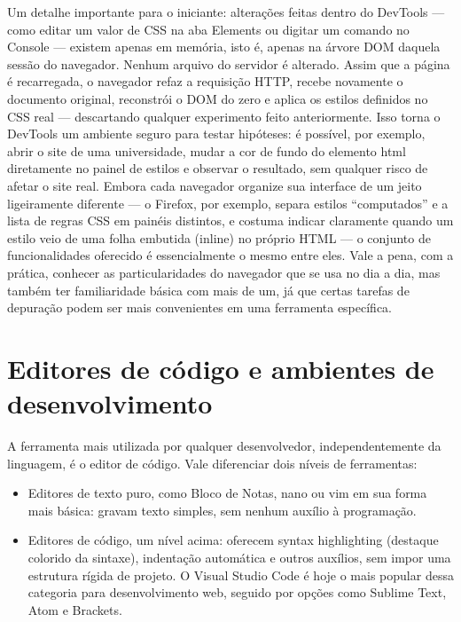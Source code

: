 Um detalhe importante para o iniciante: alterações feitas dentro do DevTools — como editar um valor de CSS na aba Elements ou digitar um comando no Console — existem apenas em memória, isto é, apenas na árvore DOM daquela sessão do navegador. Nenhum arquivo do servidor é alterado. Assim que a página é recarregada, o navegador refaz a requisição HTTP, recebe novamente o documento original, reconstrói o DOM do zero e aplica os estilos definidos no CSS real — descartando qualquer experimento feito anteriormente. Isso torna o DevTools um ambiente seguro para testar hipóteses: é possível, por exemplo, abrir o site de uma universidade, mudar a cor de fundo do elemento html diretamente no painel de estilos e observar o resultado, sem qualquer risco de afetar o site real. Embora cada navegador organize sua interface de um jeito ligeiramente diferente — o Firefox, por exemplo, separa estilos “computados” e a lista de regras CSS em painéis distintos, e costuma indicar claramente quando um estilo veio de uma folha embutida (inline) no próprio HTML — o conjunto de funcionalidades oferecido é essencialmente o mesmo entre eles. Vale a pena, com a prática, conhecer as particularidades do navegador que se usa no dia a dia, mas também ter familiaridade básica com mais de um, já que certas tarefas de depuração podem ser mais convenientes em uma ferramenta específica.

\section{Editores de código e ambientes de desenvolvimento}

A ferramenta mais utilizada por qualquer desenvolvedor, independentemente da linguagem, é o editor de código. Vale diferenciar dois níveis de ferramentas:

\begin{itemize}
  \item Editores de texto puro, como Bloco de Notas, nano ou vim em sua forma mais básica: gravam texto simples, sem nenhum auxílio à programação.
\end{itemize}

\begin{itemize}
  \item Editores de código, um nível acima: oferecem syntax highlighting (destaque colorido da sintaxe), indentação automática e outros auxílios, sem impor uma estrutura rígida de projeto. O Visual Studio Code é hoje o mais popular dessa categoria para desenvolvimento web, seguido por opções como Sublime Text, Atom e Brackets.
\end{itemize}


